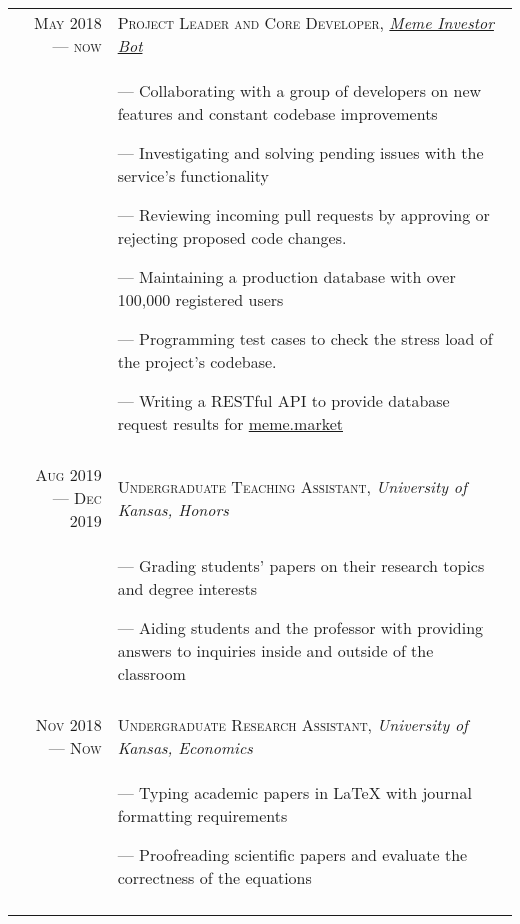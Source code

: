 \documentclass[a4paper,10pt]{article}
\begin{document}
\begin{tabular}{r|p{11cm}}
	\textsc{May 2018 --- now}      & \textsc{Project Leader and Core Developer}, \emph{\href{https://github.com/thecsw/memeinvestor_bot}{Meme Investor Bot}} \\&\footnotesize{
		--- Collaborating with a group of developers on new features and constant codebase improvements

		--- Investigating and solving pending issues with the service's functionality

		--- Reviewing incoming pull requests by approving or rejecting proposed code changes.

		--- Maintaining a production database with over 100,000 registered users

		--- Programming test cases to check the stress load of the project's codebase.

		--- Writing a RESTful API to provide database request results for \href{https://meme.market}{meme.market}
	}                                                                                                                                                        \\\multicolumn{2}{c}{}\\

	\textsc{Aug 2019 --- Dec 2019} & \textsc{Undergraduate Teaching Assistant}, \emph{University of Kansas, Honors}                                          \\&\footnotesize{
		--- Grading students' papers on their research topics and degree interests

		--- Aiding students and the professor with providing answers to inquiries inside and outside of the classroom
	}                                                                                                                                                        \\\multicolumn{2}{c}{}\\


	\textsc{Nov 2018 --- Now}      & \textsc{Undergraduate Research Assistant}, \emph{University of Kansas, Economics}                                       \\&\footnotesize{
		--- Typing academic papers in \LaTeX{} with journal formatting requirements

		--- Proofreading scientific papers and evaluate the correctness of the equations
	}                                                                                                                                                        \\\multicolumn{2}{c}{}\\
\end{tabular}
\end{document}
